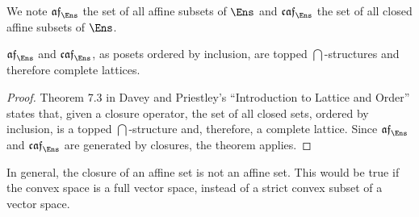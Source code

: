 \begin{mathSection}
\begin{defn}
	We note $\mathfrak{af}_{\Ens}$ the set of all affine subsets of $\Ens$ and $\mathfrak{caf}_{\Ens}$ the set of all closed affine subsets of $\Ens$.
\end{defn}

\begin{prop}
	$\mathfrak{af}_{\Ens}$ and $\mathfrak{caf}_{\Ens}$, as posets ordered by inclusion, are topped $\bigcap$-structures and therefore complete lattices.
\end{prop}

\begin{proof}
	Theorem 7.3 in Davey and Priestley's ``Introduction to Lattice and Order'' states that, given a closure operator, the set of all closed sets, ordered by inclusion, is a topped $\bigcap$-structure and, therefore, a complete lattice. Since $\mathfrak{af}_{\Ens}$ and $\mathfrak{caf}_{\Ens}$ are generated by closures, the theorem applies.
\end{proof}

\end{mathSection}

In general, the closure of an affine set is not an affine set. This would be true if the convex space is a full vector space, instead of a strict convex subset of a vector space.

